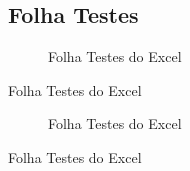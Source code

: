 \documentclass[a4paper]{article}
\begin{document}
\newpage

\begin{figure}
\subsection{Folha Testes}

\begin{figure}[H]
\centering
{}
\caption{Folha Testes do Excel}
\label{img:testes1}
\end{figure}
\end{figure}

\newpage

\begin{figure}

\begin{figure}[H]
\centering
{}
\caption{Folha Testes do Excel}
\label{img:testes2}
\end{figure}
\end{figure}
\end{document}

